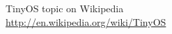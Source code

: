 \begin{thebibliography}{99}
  TinyOS topic on Wikipedia \\
  \url{http://en.wikipedia.org/wiki/TinyOS}
%
%
%
%
%
%
%
%
%
%
%

\end{thebibliography}
